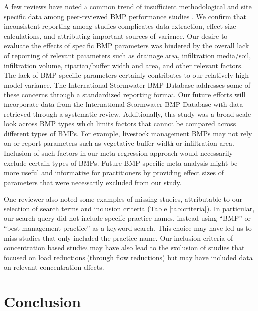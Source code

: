 \documentclass[utf8]{FrontiersinHarvard}
\begin{document}
A few reviews have noted a common trend of insufficient methodological and site specific data among peer-reviewed BMP performance studies \citep{grudzinskiDoesRiparianFencing2020, eagleMetaAnalysisConstrained2017, liuReviewEffectivenessBest2017}.
We confirm that inconsistent reporting among studies complicates data extraction, effect size calculations, and attributing important sources of variance.
Our desire to evaluate the effects of specific BMP parameters was hindered by the overall lack of reporting of relevant parameters such as drainage area, infiltration media/soil, infiltration volume, riparian/buffer width and area, and other relevant factors.
The lack of BMP specific parameters certainly contributes to our relatively high model variance.
The International Stormwater BMP Database addresses some of these concerns through a standardized reporting format.
Our future efforts will incorporate data from the International Stormwater BMP Database with data retrieved through a systematic review.
Additionally, this study was a broad scale look across BMP types which limits factors that cannot be compared across different types of BMPs.
For example, livestock management BMPs may not rely on or report parameters such as vegetative buffer width or infiltration area.
Inclusion of such factors in our meta-regression approach would necessarily exclude certain types of BMPs.
Future BMP-specific meta-analysis might be more useful and informative for practitioners by providing effect sizes of parameters that were necessarily excluded from our study.

One reviewer also noted some examples of missing studies, attributable to our selection of search terms and inclusion criteria (Table \ref{tab:criteria}).
In particular, our search query did not include specifc practice names, instead using ``BMP'' or ``best management practice'' as a keyword search.
This choice may have led us to miss studies that only included the practice name.
Our inclusion criteria of concentration based studies may have also lead to the exclusion of studies that focused on load reductions (through flow reductions) but may have included data on relevant concentration effects.

\hypertarget{conclusion}{%
\section{Conclusion}\label{conclusion}}
\end{document}
